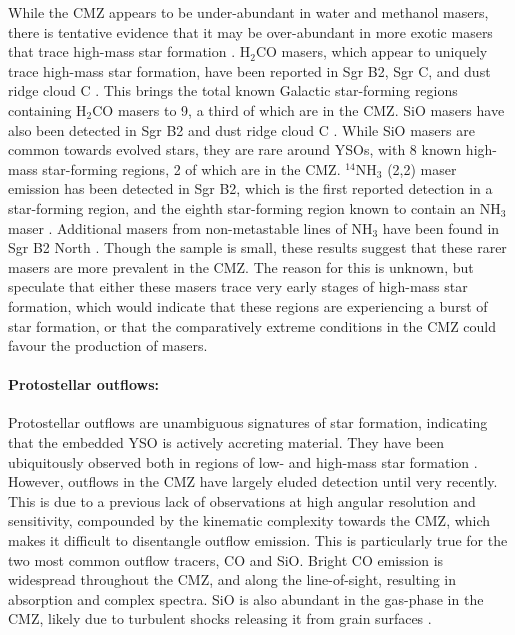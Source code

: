 While the CMZ appears to be under-abundant in water and methanol masers, there is tentative evidence that it may be over-abundant in more exotic masers that trace high-mass star formation \citep{Ginsburg2015}. H$_{2}$CO masers, which appear to uniquely trace high-mass star formation, have been reported in Sgr B2, Sgr C, and dust ridge cloud C \citep{Ginsburg2015, Lu2019a}. This brings the total known Galactic star-forming regions containing H$_{2}$CO masers to 9, a third of which are in the CMZ. SiO masers have also been detected in Sgr B2 \citep{Higuchi2014} and dust ridge cloud C \citep{Ginsburg2015}. While SiO masers are common towards evolved stars, they are rare around YSOs, with 8 known high-mass star-forming regions, 2 of which are in the CMZ. $^{14}$NH$_{3}$ (2,2) maser emission has been detected in Sgr B2, which is the first reported detection in a star-forming region, and the eighth star-forming region known to contain an NH$_{3}$ maser \citep{Mills2018a}.  Additional masers from non-metastable lines of NH$_3$ have been found in Sgr B2 North \citep{Mei2020}. Though the sample is small, these results suggest that these rarer masers are more prevalent in the CMZ. The reason for this is unknown, but \citet{Ginsburg2015} speculate that either these masers trace very early stages of high-mass star formation, which would indicate that these regions are experiencing a burst of star formation, or that the comparatively extreme conditions in the CMZ could favour the production of masers.

\paragraph{Protostellar outflows:}\label{sec:outflows} Protostellar outflows are unambiguous signatures of star formation, indicating that the embedded YSO is actively accreting material. They have been ubiquitously observed both in regions of low- and high-mass star formation \citep[e.g.][and references therein]{Bally2016}. However, outflows in the CMZ have largely eluded detection until very recently. This is due to a previous lack of observations at high angular resolution and sensitivity, compounded by the kinematic complexity towards the CMZ, which makes it difficult to disentangle outflow emission. This is particularly true for the two most common outflow tracers, CO and SiO. Bright CO emission is widespread throughout the CMZ, and along the line-of-sight, resulting in absorption and complex spectra. SiO is also abundant in the gas-phase in the CMZ, likely due to turbulent shocks releasing it from grain surfaces \citep{Martin-Pintado1997}.

